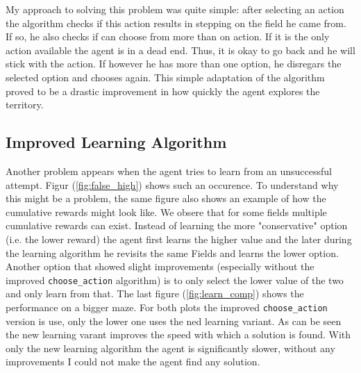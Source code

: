 \documentclass[12pt,a4paper]{scrartcl}
\begin{document}
My approach to solving this problem was quite simple: after selecting an action
the algorithm checks if this action results in stepping on the field he came
from. If so, he also checks if can choose from more than on action.
If it is the only action available the agent is in a dead end. Thus, it is okay
to go back and he will stick with the action. If however he has more than one
option, he disregars the selected option and chooses again.
This simple adaptation of the algorithm proved to be a drastic improvement in how
quickly the agent explores the territory.

\subsection{Improved Learning Algorithm}
\label{sec:improved_learn}

Another problem appears when the agent tries to learn from an unsuccessful
attempt. Figur (\ref{fig:false_high}) shows such an occurence. To understand why
this might be a problem, the same figure also shows an example of how the
cumulative rewards might look like. We obsere that for some fields multiple
cumulative rewards can exist. Instead of learning the more "conservative" option
(i.e. the lower reward) the agent first learns the higher value and the later
during the learning algorithm he revisits the same Fields and learns the lower
option. Another option that showed slight improvements (especially without the
improved \texttt{choose\_action} algorithm) is to only select the lower value of
the two and only learn from that. The last figure (\ref{fig:learn_comp}) shows
the performance on a bigger maze. For both plots the improved
\texttt{choose\_action} version is use, only the lower one uses the ned learning
variant. As can be seen the new learning varant improves the speed with which
a solution is found. With only the new learning algorithm the agent is
significantly slower, without any improvements I could not make the agent find
any solution.
\end{document}
